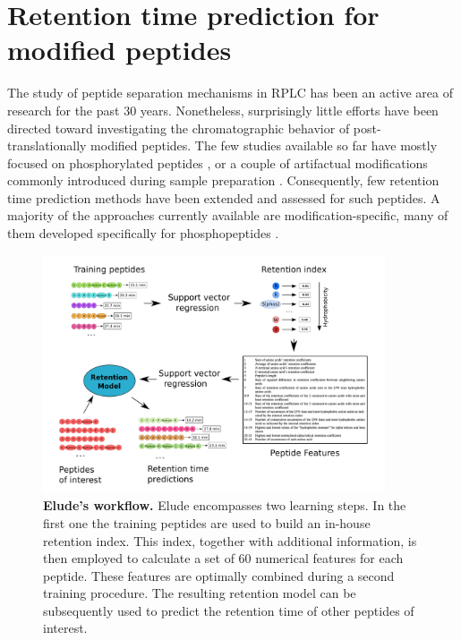 \documentclass[a4paper]{article}
\begin{document}
\section{\label{sec:rtpredm}Retention time prediction for modified peptides}

The study of peptide separation mechanisms in RPLC has been an active
area of research for the past 30 years. Nonetheless, surprisingly
little efforts have been directed toward investigating the
chromatographic behavior of post-translationally modified
peptides. The few studies available so far have mostly focused on
phosphorylated peptides \cite{Kim2007}, or a couple of artifactual
modifications commonly introduced during sample preparation
\cite{Reimer2011}. Consequently, few retention time prediction methods
have been extended and assessed for such peptides. A majority of the
approaches currently available are modification-specific, many of them
developed specifically for phosphopeptides \cite{Kawakami2005,
  perlova2010}.

\begin{figure}[p]
\centering 
\includegraphics[width=0.9\textwidth]{img/elude-ptm.pdf}
\caption{\label{fig:elude} {\bf {\sc Elude}'s workflow.}  {\sc Elude} encompasses two learning steps. In the first one the training peptides are used to build an in-house retention index. This index, together with additional information, is then employed to calculate a set of 60 numerical features for each peptide. These features are optimally combined during a second training procedure. The resulting retention model can be subsequently used to predict the retention time of other peptides of interest.}
\end{figure}
\end{document}
